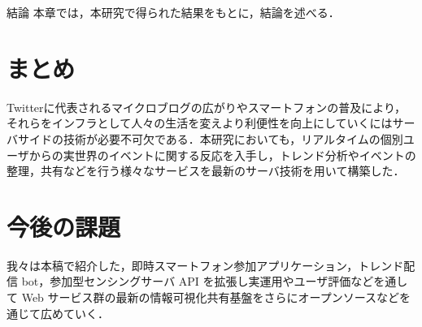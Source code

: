 \chapterhead
{結論}
{本章では，本研究で得られた結果をもとに，結論を述べる．}

\section{まとめ}
Twitterに代表されるマイクロブログの広がりやスマートフォンの普及により，それらをインフラとして人々の生活を変えより利便性を向上にしていくにはサーバサイドの技術が必要不可欠である．本研究においても，リアルタイムの個別ユーザからの実世界のイベントに関する反応を入手し，トレンド分析やイベントの整理，共有などを行う様々なサービスを最新のサーバ技術を用いて構築した．

\section{今後の課題}
我々は本稿で紹介した，即時スマートフォン参加アプリケーション，トレンド配信 bot，参加型センシングサーバ API を拡張し実運用やユーザ評価などを通して Web サービス群の最新の情報可視化共有基盤をさらにオープンソースなどを通じて広めていく．
